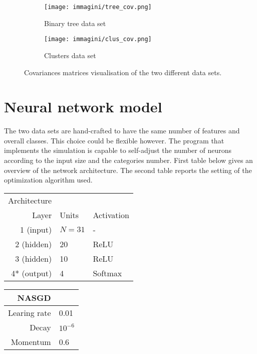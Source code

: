 \documentclass[a4paper,12pt]{article}
\begin{document}
\begin{figure}[t!]
	\begin{subfigure}{0.5\textwidth}
		\texttt{[image: immagini/tree\_cov.png]}
		\caption{Binary tree data set}
		\label{fig:tree_cov}
	\end{subfigure}
	\hspace{2mm}
	\begin{subfigure}{0.5\textwidth}
		\texttt{[image: immagini/clus\_cov.png]}
		\caption{Clusters data set}
		\label{fig:clus_cov}
	\end{subfigure}
	\caption{Covariances matrices visualisation of the two different data sets.}
	\label{fig:covs}
\end{figure}




\section{Neural network model}
\label{secc:system}

The two data sets are hand-crafted to have the same number of features and overall classes. This choice could be flexible however. The program that implements the simulation is capable to self-adjust the number of neurons according to the input size and the categories number. First table below gives an overview of the network architecture. The second table reports the setting of the optimization algorithm used.

\begin{table}[h!]
	\begin{center}
		\begin{tabular}{r l l}
			Architecture  & & \\
			Layer         & Units    & Activation \\
			\hline
			1 (input)     & $N = 31$ & -          \\
			2 (hidden)    & 20       & ReLU       \\
			3 (hidden)    & 10       & ReLU       \\
			4* (output)    & 4        & Softmax    \\
		\end{tabular}
	\end{center}
\end{table}


\begin{table}[h!]
	\begin{center}
		\begin{tabular}{r l}
			NASGD        & \\
			\hline
			Learing rate & 0.01 \\
			Decay        & $10^{-6}$ \\
			Momentum     & 0.6
		\end{tabular}
	\end{center}
\end{table}
\end{document}
